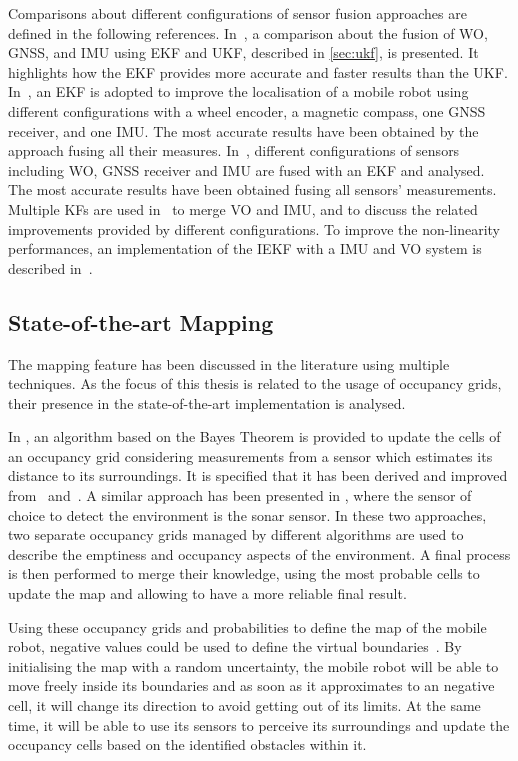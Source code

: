 Comparisons about different configurations of sensor fusion approaches are defined in the following references.
In~\cite{amador_robot_2019}, a comparison about the fusion of \gls{WO}, \gls{GNSS}, and \gls{IMU} using \gls{EKF} and \gls{UKF}, described in \ref{sec:ukf}, is presented. It highlights how the \gls{EKF} provides more accurate and faster results than the \gls{UKF}.
In~\cite{7373480}, an \gls{EKF} is adopted to improve the localisation of a mobile robot using different configurations with a wheel encoder, a magnetic compass, one \gls{GNSS} receiver, and one \gls{IMU}. The most accurate results have been obtained by the approach fusing all their measures.
In~\cite{8696103}, different configurations of sensors including \gls{WO}, \gls{GNSS} receiver and \gls{IMU} are fused with an \gls{EKF} and analysed. The most accurate results have been obtained fusing all sensors' measurements.
Multiple \glspl{KF} are used in~\cite{liu2016stereo} to merge \gls{VO} and \gls{IMU}, and to discuss the related improvements provided by different configurations.
To improve the non-linearity performances, an implementation of the \gls{IEKF} with a \gls{IMU} and \gls{VO} system is described in~\cite{bloesch2017iterated}.


\subsection{State-of-the-art Mapping} 
\noindent The mapping feature has been discussed in the literature using multiple techniques.
As the focus of this thesis is related to the usage of occupancy grids, their presence in the state-of-the-art implementation is analysed.

In \cite{joubert2012adaptive}, an algorithm based on the Bayes Theorem is provided to update the cells of an occupancy grid considering measurements from a sensor which estimates its distance to its surroundings.
It is specified that it has been derived and improved from~\cite{thrun_probabilistic_2005} and~\cite{12145}.
A similar approach has been presented in \cite{singh_sonar_2019}, where the sensor of choice to detect the environment is the sonar sensor.
In these two approaches, two separate occupancy grids managed by different algorithms are used to describe the emptiness and occupancy aspects of the environment. 
A final process is then performed to merge their knowledge, using the most probable cells to update the map and allowing to have a more reliable final result.

Using these occupancy grids and probabilities to define the map of the mobile robot, negative values could be used to define the virtual boundaries~\cite{thrun_probabilistic_2005}.
By initialising the map with a random uncertainty, the mobile robot will be able to move freely inside its boundaries and as soon as it approximates to an negative cell, it will change its direction to avoid getting out of its limits.
At the same time, it will be able to use its sensors to perceive its surroundings and update the occupancy cells based on the identified obstacles within it.

